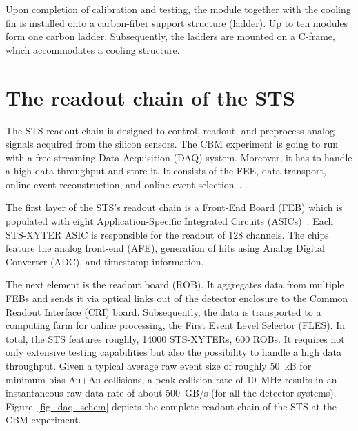 Upon completion of calibration and testing, the module together with the cooling fin is installed onto a carbon-fiber support structure (ladder). Up to ten modules form one carbon ladder. Subsequently, the ladders are mounted on a C-frame, which accommodates a cooling structure. 
\section{The readout chain of the STS}
\label{readout}
\label{DAQ}
The \gls{STS} readout chain is designed to control, readout, and preprocess analog signals acquired from the silicon sensors. The \gls{CBM} experiment is going to run with a free-streaming Data Acquisition (\gls{DAQ}) system. Moreover, it has to handle a high data throughput and store it. It consists of the \gls{FEE}, data transport, online event reconstruction, and online event selection~\cite{Kasinski1}.

The first layer of the \gls{STS}'s readout chain is a Front-End Board (\gls{FEB}) which is populated with eight Application-Specific Integrated Circuits (ASICs)~\cite{Kasinski2}. Each STS-XYTER ASIC is responsible for the readout of 128 channels. The chips feature the analog front-end (\gls{AFE}), generation of hits using Analog Digital Converter (\gls{ADC}), and timestamp information. 

The next element is the readout board (\gls{ROB}). It aggregates data from multiple \glspl{FEB} and sends it via optical links out of the detector enclosure to the Common Readout Interface (\gls{CRI}) board. Subsequently, the data is transported to a computing farm for online processing, the First Event Level Selector (FLES). 
\newpage
In total, the \gls{STS} features roughly, 14000 STS-XYTERs, 600 \glspl{ROB}. It requires not only extensive testing capabilities but also the possibility to handle a high data throughput. Given a typical average raw event size of roughly 50~kB for minimum-bias Au+Au collisions, a peak collision rate of 10~MHz results in an instantaneous raw data rate of about 500~GB/s (for all the detector systems). Figure~\ref{fig_daq_schem} depicts the complete readout chain of the \gls{STS} at the \gls{CBM} experiment. 

